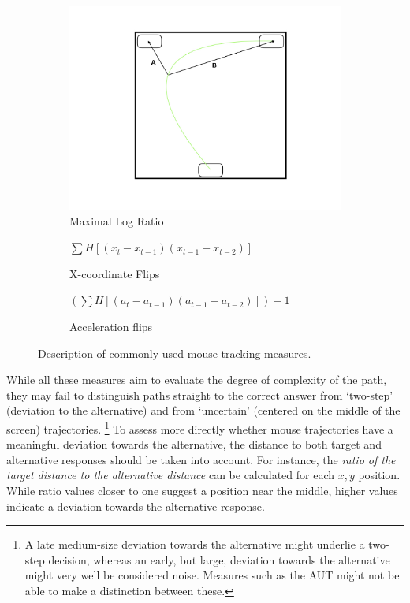 \documentclass{article}
\begin{document}
\begin{figure}[h]
\begin{subfigure}[b]{0.3\textwidth}
\includegraphics[width=\textwidth]{MaxRatio.jpeg}
\caption{Maximal Log Ratio}
\end{subfigure}
\vspace{.5cm}

\begin{subfigure}[b]{0.45\textwidth}
\caption{X-coordinate Flips}
\centering
\(\sum H[(x_{t} - x_{t-1})(x_{t-1} - x_{t-2})] \)
\end{subfigure}
%
\begin{subfigure}[b]{0.45\textwidth}
\caption{Acceleration flips}
\centering
\((\sum H[( a_{t} - a_{t-1})( a_{t-1} - a_{t-2})])-1 \)

\end{subfigure}

\caption{Description of commonly used mouse-tracking measures.}
\label{fig:traditional-measures}

\end{figure}



While all these measures aim to evaluate the degree of complexity of the path, they may fail to distinguish paths straight to the correct answer from `two-step' (deviation to the alternative) and from `uncertain' (centered on the middle of the screen) trajectories.%
%
\footnote{A late medium-size deviation towards the alternative might underlie a two-step decision, whereas an early, but large, deviation towards the alternative might very well be considered noise. Measures such as the AUT might not be able to make a distinction between these.} 
To assess more directly whether mouse trajectories have a meaningful deviation towards the alternative, the distance to both target and alternative responses should be taken into account. 
For instance, the \textit{ratio of the target distance to the alternative distance} can be calculated for each $x,y$ position. While ratio values closer to one suggest a position near the middle, higher values indicate a deviation towards the alternative response. 
\end{document}
